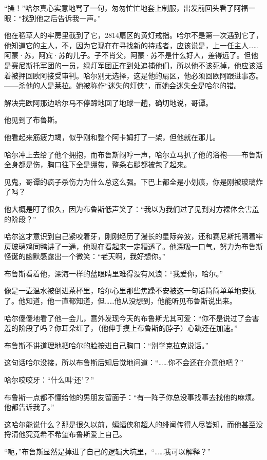 \documentclass[../main]{subfiles}
\begin{document}
“操！”哈尔真心实意地骂了一句，匆匆忙忙地套上制服，出发前回头看了阿福一眼：“找到他之后告诉我一声。”

他在稻草人的牢房里截到了它，2814扇区的黄灯戒指。哈尔不是第一次遇到它了，他知道它的主人，不，因为它现在在寻找新的持戒者，应该说是，上一任主人……阿蒙·苏，阿宾·苏的儿子。子不肖父，阿蒙·苏不是什么好人，差得远了。但他是赛尼斯托军团的一员，绿灯军团正在到处追捕他们，所以他不该死掉，他应该活着被押回欧阿接受审判。哈尔别无选择，这是他的扇区，他必须回欧阿跟进事态。——杀他的人是莱拉。她被称作“迷失的灯侠”，而她会迷失全是哈尔的错。

解决完欧阿那边哈尔马不停蹄地回了地球一趟，确切地说，哥谭。

他见到了布鲁斯。

他看起来筋疲力竭，似乎刚和整个阿卡姆打了一架，但他就在那儿。

哈尔冲上去给了他个拥抱，而布鲁斯闷哼一声，哈尔立马扒了他的浴袍——布鲁斯全身都是伤，胸口往下全是绷带，整条右腿都被包了起来。

见鬼，哥谭的疯子杀伤力为什么总这么强。下巴上都全是小划痕，你是刚被玻璃炸了吗？

他大概是盯了很久，因为布鲁斯低声笑了：“我以为我们过了见到对方裸体会害羞的阶段？”

哈尔这才意识到自己紧咬着牙，刚刚经历了漫长的星际奔波，还和赛尼斯托隔着牢房玻璃鸡同鸭讲了一通，他现在看起来一定糟透了。他深吸一口气，努力为布鲁斯怪诞的幽默感露出一个微笑：“老天啊，我好想你。”

布鲁斯看着他，深海一样的蓝眼睛里难得没有风浪：“我爱你，哈尔。”

像是一壶温水被倒进茶杯里，哈尔心里那些焦躁不安被这一句话简简单单地安抚了。他知道，他一直都知道，但……他从没想到，他能听见布鲁斯说出来。

哈尔傻傻地看了他一会儿，意外发现今天的布鲁斯尤其可爱：“你不是说过了会害羞的阶段了吗？你耳朵红了，（他伸手摸上布鲁斯的脖子）心跳还在加速。”

布鲁斯不讲道理地把哈尔的脸按进自己胸口：“别学克拉克说话。”

这句话哈尔没接，所以布鲁斯后知后觉地问道：“……你不会还在介意他吧？”

哈尔咬咬牙：“什么叫‘还’？”

布鲁斯一点都不懂给他的男朋友留面子：“有一阵子你总没事找事去找他的麻烦。他都告诉我了。”

这哈尔能说什么？那是很久以前，蝙蝠侠和超人的绯闻传得人尽皆知，而他甚至没捋清他究竟希不希望布鲁斯爱上自己。

“呃，”布鲁斯显然是掉进了自己的逻辑大坑里，“……我可以解释？”
\end{document}
